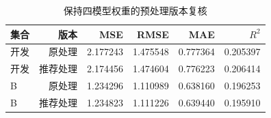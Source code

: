 \begin{table}[htbp]
\small
\setlength{\tabcolsep}{5pt}
\centering
\caption{保持四模型权重的预处理版本复核}
\label{tab:fusion-treatment}
\begin{tabular}{lrrrrr}
\toprule
集合 & 版本 & MSE & RMSE & MAE & $R^2$ \\
\midrule
开发 & 原处理 & 2.177243 & 1.475548 & 0.777364 & 0.205397 \\
开发 & 推荐处理 & 2.174456 & 1.474604 & 0.776223 & 0.206414 \\
B & 原处理 & 1.234296 & 1.110989 & 0.638160 & 0.196253 \\
B & 推荐处理 & 1.234823 & 1.111226 & 0.639440 & 0.195910 \\
\bottomrule
\end{tabular}
\end{table}
